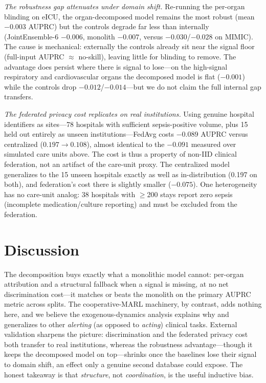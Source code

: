 \documentclass[conference]{IEEEtran}
\begin{document}
\emph{The robustness gap attenuates under domain shift.} Re-running the per-organ
blinding on eICU, the organ-decomposed model remains the most robust (mean $-0.003$
AUPRC) but the controls degrade far less than internally (JointEnsemble-6 $-0.006$,
monolith $-0.007$, versus $-0.030$/$-0.028$ on MIMIC). The cause is mechanical:
externally the controls already sit near the signal floor (full-input AUPRC $\approx$
no-skill), leaving little for blinding to remove. The advantage does persist where
there is signal to lose---on the high-signal respiratory and cardiovascular organs the
decomposed model is flat ($-0.001$) while the controls drop $-0.012$/$-0.014$---but we
do not claim the full internal gap transfers.

\emph{The federated privacy cost replicates on real institutions.} Using genuine
hospital identifiers as sites---78 hospitals with sufficient sepsis-positive volume,
plus 15 held out entirely as unseen institutions---FedAvg costs $-0.089$ AUPRC versus
centralized ($0.197\!\to\!0.108$), almost identical to the $-0.091$ measured over
simulated care units above. The cost is thus a property of non-IID clinical
federation, not an artifact of the care-unit proxy. The centralized model generalizes
to the 15 unseen hospitals exactly as well as in-distribution (0.197 on both), and
federation's cost there is slightly smaller ($-0.075$). One heterogeneity has no
care-unit analog: 38 hospitals with $\geq$200 stays report zero sepsis (incomplete
medication/culture reporting) and must be excluded from the federation.

\section{Discussion}
The decomposition buys exactly what a monolithic model cannot: per-organ
attribution and a structural fallback when a signal is missing, at no net
discrimination cost---it matches or beats the monolith on the primary AUPRC metric
across splits. The cooperative-MARL machinery, by contrast, adds nothing here,
and we believe the exogenous-dynamics analysis explains why and generalizes to other
\emph{alerting} (as opposed to \emph{acting}) clinical tasks. External validation
sharpens the picture: discrimination and the federated privacy cost both transfer to
real institutions, whereas the robustness advantage---though it keeps the decomposed
model on top---shrinks once the baselines lose their signal to domain shift, an effect
only a genuine second database could expose. The honest takeaway is that
\emph{structure}, not \emph{coordination}, is the useful inductive bias.
\end{document}

